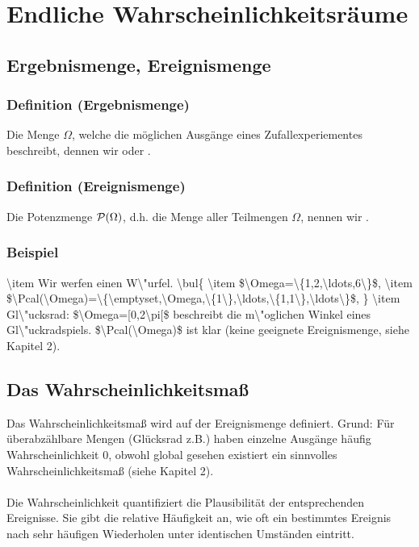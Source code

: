 \section{Endliche Wahrscheinlichkeitsr\"aume}
\subsection{Ergebnismenge, Ereignismenge}
\subsubsection{Definition (Ergebnismenge)}
Die Menge $\Omega$, welche die m\"oglichen Ausg\"ange eines Zufallexperiementes beschreibt, dennen wir  oder .
\subsubsection{Definition (Ereignismenge)}
Die Potenzmenge $\Pcal(\Omega)$, d.h. die Menge aller Teilmengen $\Omega$, nennen wir .
\subsubsection{Beispiel}
\num{
\item Wir werfen einen W\"urfel.
\bul{
\item $\Omega=\{1,2,\ldots,6\}$,
\item $\Pcal(\Omega)=\{\emptyset,\Omega,\{1\},\ldots,\{1,1\},\ldots\}$,
}
\item Gl\"ucksrad: $\Omega=[0,2\pi[$ beschreibt die m\"oglichen Winkel eines Gl\"uckradspiels. $\Pcal(\Omega)$ ist klar (keine geeignete Ereignismenge, siehe Kapitel 2).
}
\subsection{Das Wahrscheinlichkeitsma\ss{}}
Das Wahrscheinlichkeitsma\ss{} wird auf der Ereignismenge definiert. Grund: F\"ur \"uberabz\"ahlbare Mengen (Gl\"ucksrad z.B.) haben einzelne Ausg\"ange h\"aufig Wahrscheinlichkeit $0$, obwohl global gesehen existiert ein sinnvolles Wahrscheinlichkeitsma\ss{} (siehe Kapitel 2).
\\~\\
Die Wahrscheinlichkeit quantifiziert die Plausibilit\"at der entsprechenden Ereignisse. Sie gibt die relative H\"aufigkeit an, wie oft ein bestimmtes Ereignis nach sehr h\"aufigen Wiederholen unter identischen Umst\"anden eintritt.
